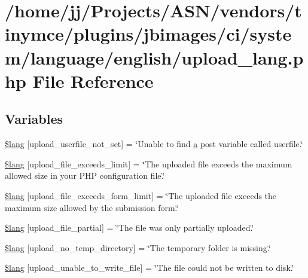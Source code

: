 \hypertarget{system_2language_2english_2upload__lang_8php}{}\section{/home/jj/\+Projects/\+A\+S\+N/vendors/tinymce/plugins/jbimages/ci/system/language/english/upload\+\_\+lang.php File Reference}
\label{system_2language_2english_2upload__lang_8php}
\subsection*{Variables}
\begin{DoxyCompactItemize}
\item 
\hyperlink{system_2language_2english_2upload__lang_8php_a6d12ff4074b1e4c6f22a4a5107fae5ee}{\$lang} \mbox{[}\textquotesingle{}upload\+\_\+userfile\+\_\+not\+\_\+set\textquotesingle{}\mbox{]} = \char`\"{}Unable to find \hyperlink{_chart_8min_8js_aef3b685c08bc6c76c8e729bd0e93901d}{a} post variable called userfile.\char`\"{}
\item 
\hyperlink{system_2language_2english_2upload__lang_8php_a9028f049ebbe292a27e0e2b2e5f7d660}{\$lang} \mbox{[}\textquotesingle{}upload\+\_\+file\+\_\+exceeds\+\_\+limit\textquotesingle{}\mbox{]} = \char`\"{}The uploaded file exceeds the maximum allowed size in your P\+HP configuration file.\char`\"{}
\item 
\hyperlink{system_2language_2english_2upload__lang_8php_af6f65d563af150d50dfc6957079fd529}{\$lang} \mbox{[}\textquotesingle{}upload\+\_\+file\+\_\+exceeds\+\_\+form\+\_\+limit\textquotesingle{}\mbox{]} = \char`\"{}The uploaded file exceeds the maximum size allowed by the submission form.\char`\"{}
\item 
\hyperlink{system_2language_2english_2upload__lang_8php_a79751b02ce35007a90bd9052f83deed9}{\$lang} \mbox{[}\textquotesingle{}upload\+\_\+file\+\_\+partial\textquotesingle{}\mbox{]} = \char`\"{}The file was only partially uploaded.\char`\"{}
\item 
\hyperlink{system_2language_2english_2upload__lang_8php_ac7144f4992346816875bac28488ef715}{\$lang} \mbox{[}\textquotesingle{}upload\+\_\+no\+\_\+temp\+\_\+directory\textquotesingle{}\mbox{]} = \char`\"{}The temporary folder is missing.\char`\"{}
\item 
\hyperlink{system_2language_2english_2upload__lang_8php_a620b622468d4e7781fed6316440c85e7}{\$lang} \mbox{[}\textquotesingle{}upload\+\_\+unable\+\_\+to\+\_\+write\+\_\+file\textquotesingle{}\mbox{]} = \char`\"{}The file could not be written to disk.\char`\"{}

\end{DoxyCompactItemize}
